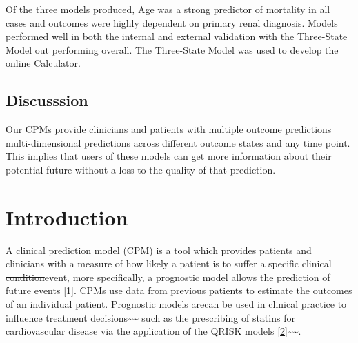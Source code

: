 \documentclass[
]{article}
\begin{document}
Of the three models produced, Age was a strong predictor of mortality in all cases and outcomes were highly dependent on primary renal diagnosis. Models performed well in both the internal and external validation with the Three-State Model out performing overall. The Three-State Model was used to develop the online Calculator.

\hypertarget{discusssion}{%
\subsection*{Discusssion}\label{discusssion}}

Our CPMs provide clinicians and patients with \sout{multiple outcome predictions} multi-dimensional predictions across different outcome states and any time point. This implies that users of these models can get more information about their potential future without a loss to the quality of that prediction.

\hypertarget{introduction-1}{%
\section{Introduction}\label{introduction-1}}

A clinical prediction model (CPM) is a tool which provides patients and clinicians with a measure of how likely a patient is to suffer a specific clinical \sout{condition}event, more specifically, a prognostic model allows the prediction of future events {[}\protect\hyperlink{ref-steyerberg_prognosis_2013}{1}{]}. CPMs use data from previous patients to estimate the outcomes of an individual patient. Prognostic models \sout{are}can be used in clinical practice to influence treatment decisions\textasciitilde\textasciitilde{} such as the prescribing of statins for cardiovascular disease via the application of the QRISK models {[}\protect\hyperlink{ref-hippisley-cox_development_2017}{2}{]}\textasciitilde\textasciitilde.
\end{document}
